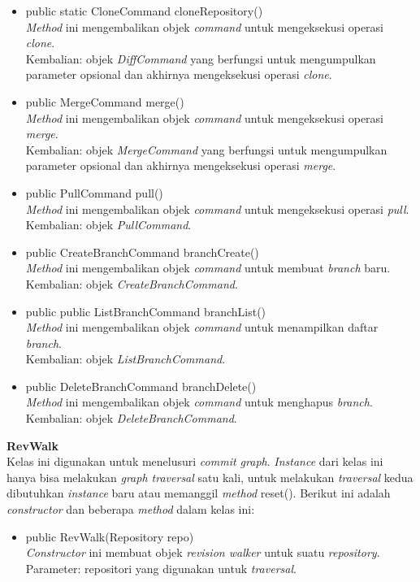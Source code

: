 \documentclass[a4paper,twoside]{article}
\begin{document}
\begin{enumerate}
\begin{itemize}
\item public static CloneCommand cloneRepository()\\
\textit{Method} ini mengembalikan objek \textit{command} untuk mengeksekusi operasi \textit{clone}.\\
Kembalian: objek \textit{DiffCommand} yang berfungsi untuk mengumpulkan parameter opsional dan akhirnya mengeksekusi operasi \textit{clone}.

\item public MergeCommand merge()\\
\textit{Method} ini mengembalikan objek \textit{command} untuk mengeksekusi operasi \textit{merge}.\\
Kembalian: objek \textit{MergeCommand} yang berfungsi untuk mengumpulkan parameter opsional dan akhirnya mengeksekusi operasi \textit{merge}.

\item public PullCommand pull()\\
\textit{Method} ini mengembalikan objek \textit{command} untuk mengeksekusi operasi \textit{pull}.\\
Kembalian: objek \textit{PullCommand}.

\item public CreateBranchCommand branchCreate()\\
\textit{Method} ini mengembalikan objek \textit{command} untuk membuat \textit{branch} baru.\\
Kembalian: objek \textit{CreateBranchCommand}.

\item public public ListBranchCommand branchList()\\
\textit{Method} ini mengembalikan objek \textit{command} untuk menampilkan daftar \textit{branch}.\\
Kembalian: objek \textit{ListBranchCommand}.

\item public DeleteBranchCommand branchDelete()\\
\textit{Method} ini mengembalikan objek \textit{command} untuk menghapus \textit{branch}.\\
Kembalian: objek \textit{DeleteBranchCommand}.
\end{itemize}

\textbf{RevWalk}\\
Kelas ini digunakan untuk menelusuri \textit{commit graph}. \textit{Instance} dari kelas ini hanya bisa melakukan  \textit{graph traversal} satu kali, untuk melakukan \textit{traversal} kedua dibutuhkan \textit{instance} baru atau memanggil \textit{method} reset(). Berikut ini adalah \textit{constructor} dan beberapa \textit{method} dalam kelas ini:
\begin{itemize}
\item public RevWalk(Repository repo)\\
\textit{Constructor} ini membuat objek \textit{revision walker} untuk suatu \textit{repository}.\\
Parameter: repositori yang digunakan untuk \textit{traversal}.  


\end{itemize}
\end{enumerate}
\end{document}
